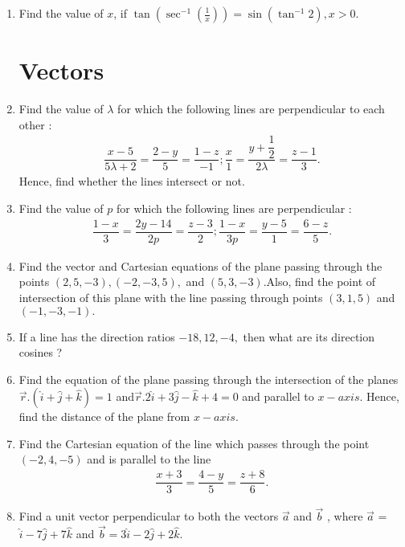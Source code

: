 \documentclass[12pt,-letter paper]{article}
\providecommand{\brak}[1]{\ensuremath{\left(#1\right)}}
\begin{document}
\begin{enumerate}
\item Find the value of $x$, if $\tan \brak{\sec^{-1}\brak{\frac{1}{x}}} = \sin \brak{\tan^{-1}{2}},x > 0$.

\section{Vectors}

\item Find the value of $\lambda$ for which the following lines are perpendicular to each other :
\begin{align*}
    \dfrac{x-5}{5{\lambda+2}}=\dfrac{2-y}{5}=\dfrac{1-z}{-1};\dfrac{x}{1}=\dfrac{y+\dfrac{1}{2}}{2{\lambda}}=\dfrac{z-1}{3}.
\end{align*}
Hence, find whether the lines intersect or not.

\item Find the value of $p$ for which the following lines are perpendicular :
\begin{align*}
\dfrac{1-x}{3}= \dfrac{2y-14}{2p} = \dfrac{z-3}{2}; \dfrac{1-x}{3p} = \dfrac{y-5}{1} = \dfrac{6-z}{5}.
\end{align*}

\item Find the vector and Cartesian equations of the plane passing through the points $\brak{2,5,-3},\brak{-2,-3,5},$ and $\brak{5,3,-3}$.Also, find the point of intersection of this plane with the line passing through points $\brak{3,1,5} $ and $\brak{-1,-3,-1}.$

\item If a line has the direction ratios $-18, 12, -4,$ then what are its direction cosines ? 

\item Find the equation of the plane passing through the intersection of the planes $\overrightarrow r.\brak{\hat{i}+\hat{j}+\hat{k}}=1 $ and$\overrightarrow  r .2\hat{i}+3\hat{j}-\hat{k}+4=0 $ and parallel to $x-axis$. Hence, find the distance of the plane from $x-axis$.

\item Find the Cartesian equation of the line which passes through the point $\brak{- 2, 4,-5}$ and is parallel to the line 
\begin{align*}
\dfrac{x+3}{3}=\dfrac{4-y}{5}=\dfrac{z+8}{6}.
\end{align*}

\item Find a unit vector perpendicular to both the vectors 
$ \overrightarrow a $ and $ \overrightarrow b $ , where $ \overrightarrow a $ = $\hat{i} -7\hat{j} +7\hat{k}$ and $ \overrightarrow b = 3 \hat{i} -2 \hat{j}+ 2 \hat{k}$.


\end{enumerate}
\end{document}
